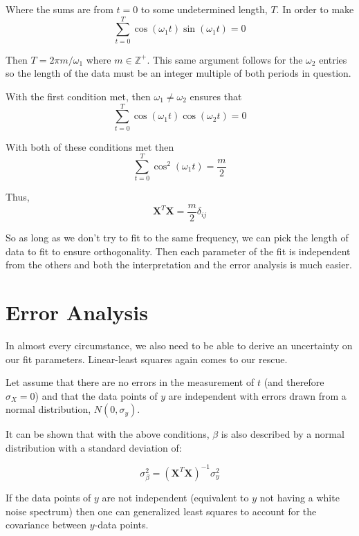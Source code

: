 \documentclass{article}
\begin{document}
Where the sums are from $t=0$ to some undetermined length, $T$. In order to make 
\begin{equation}
\sum_{t=0}^T \cos(\omega_1 t)\sin(\omega_1 t)=0
\end{equation}

Then $T=2\pi m/\omega_1$ where $m\in \mathbb{Z}^+$. This same argument follows for the $\omega_2$ entries so the length of the data must be an integer multiple of both periods in question. 

With the first condition met, then $\omega_1 \neq \omega_2$ ensures that
\begin{equation}
\sum_{t=0}^T \cos(\omega_1 t)\cos(\omega_2 t)=0
\end{equation}

With both of these conditions met then 
\begin{equation}
\sum_{t=0}^T \cos^2(\omega_1 t)=\frac{m}{2}
\end{equation}

Thus,
\begin{equation}
\mathbf{X}^T\mathbf{X} =\frac{m}{2} \delta_{ij}
\end{equation}

So as long as we don't try to fit to the same frequency, we can pick the length of data to fit to ensure orthogonality. Then each parameter of the fit is independent from the others and both the interpretation and the error analysis is much easier. 

\section{Error Analysis}

In almost every circumstance, we also need to be able to derive an uncertainty on our fit parameters. Linear-least squares again comes to our rescue.

Let assume that there are no errors in the measurement of $t$ (and therefore $\sigma_X=0$) and that the data points of $y$ are independent with errors drawn from a normal distribution, $N(0,\sigma_y)$. 

It can be shown that with the above conditions, $\beta$ is also described by a normal distribution with a standard deviation of:

\begin{equation}
\sigma_\beta^2=(\mathbf{X}^T\mathbf{X})^{-1} \sigma_y^2
\end{equation}

If the data points of $y$ are not independent (equivalent to $y$ not having a white noise spectrum) then one can generalized least squares to account for the covariance between $y$-data points.
\end{document}
